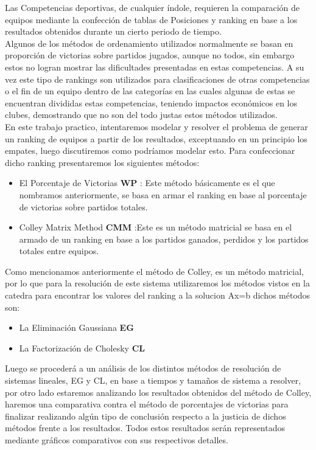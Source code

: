 Las Competencias deportivas, de cualquier índole, requieren la comparación de equipos mediante la confección de tablas de Posiciones y ranking en base a los 
resultados obtenidos durante un cierto periodo de tiempo.\\
Algunos de los métodos de ordenamiento utilizados normalmente se basan en proporción de victorias 
sobre partidos jugados, aunque no todos, sin embargo estos no logran mostrar las dificultades presentadas en estas competencias. A su vez este tipo de 
rankings son utilizados para clasificaciones de otras competencias o el fin de un equipo dentro de las categorías en las cuales algunas de estas se encuentran divididas estas 
competencias, teniendo impactos económicos en los clubes, demostrando que no son del todo justas estos métodos utilizados.\\
En este trabajo practico, intentaremos modelar y resolver el problema de generar un ranking de equipos a partir de los resultados, exceptuando en un principio los empates,
luego discutiremos como podríamos modelar esto.
Para confeccionar dicho ranking presentaremos los siguientes métodos:
\begin{itemize}  
\item El Porcentaje de Victorias \textbf{WP} : Este método básicamente es el que nombramos anteriormente, se basa en armar el ranking en base al porcentaje de victorias sobre partidos totales.
\item Colley Matrix Method \textbf{CMM} :Este es un método matricial se basa en el armado de un ranking en base a los partidos ganados, perdidos y los partidos totales entre equipos.
\end{itemize}

Como mencionamos anteriormente el método de Colley, es un método matricial, por lo que para la resolución de este sistema utilizaremos los métodos vistos en
la catedra para encontrar los valores del ranking a la solucion Ax=b dichos métodos son:

\begin{itemize}  
\item La Eliminación Gaussiana \textbf{EG}
\item La Factorización de Cholesky \textbf{CL}
\end{itemize}

Luego se procederá a un análisis de los distintos métodos de resolución de sistemas lineales, EG y CL, en base a tiempos y tamaños de sistema a resolver,
por otro lado estaremos analizando los resultados obtenidos del método de Colley, haremos una comparativa contra el método de porcentajes de victorias para 
finalizar realizando algún tipo de conclusión respecto a la justicia de dichos métodos frente a los resultados. Todos estos resultados serán representados 
mediante gráficos comparativos con sus respectivos detalles.


